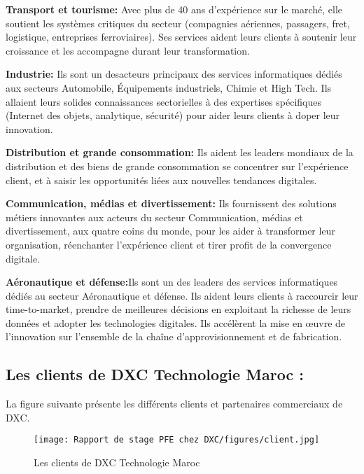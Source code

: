 \begin{description}
  \item \textbf{Transport et tourisme:} Avec plus de 40 ans d’expérience sur le marché, elle soutient les systèmes critiques du secteur (compagnies aériennes, passagers, fret, logistique, entreprises ferroviaires). Ses services aident leurs clients à soutenir leur croissance et les accompagne durant leur transformation.
  \item \textbf{Industrie:} Ils sont un desacteurs principaux des services informatiques dédiés aux secteurs Automobile, Équipements industriels, Chimie et High Tech. Ils allaient leurs solides connaissances sectorielles à des expertises spécifiques (Internet des objets, analytique, sécurité) pour aider leurs clients à doper leur innovation.
  \item \textbf{Distribution et grande consommation:} Ils aident les leaders mondiaux de la distribution et des biens de grande consommation se concentrer sur l’expérience client, et à saisir les opportunités liées aux nouvelles tendances digitales.
  \item \textbf{Communication, médias et divertissement:} Ils fournissent des solutions métiers innovantes aux acteurs du secteur Communication, médias et divertissement, aux quatre coins du monde, pour les aider à transformer leur organisation, réenchanter l’expérience client et tirer profit de la convergence digitale.
  \item \textbf{Aéronautique et défense:}Ils sont un des leaders des services informatiques dédiés au secteur Aéronautique et défense. Ils aident leurs clients à raccourcir leur time-to-market, prendre de meilleures décisions en exploitant la richesse de leurs données et adopter les technologies digitales. Ils accélèrent la mise en œuvre de l’innovation sur l’ensemble de la chaîne d’approvisionnement et de fabrication.
  
\end{description}

\subsection{Les clients de DXC Technologie Maroc :}

La figure suivante présente les différents clients et partenaires commerciaux de DXC.

\begin{figure}[!h]
    \centering
    \texttt{[image: Rapport de stage PFE chez DXC/figures/client.jpg]}
    \caption{Les clients de DXC Technologie Maroc}
\end{figure}


